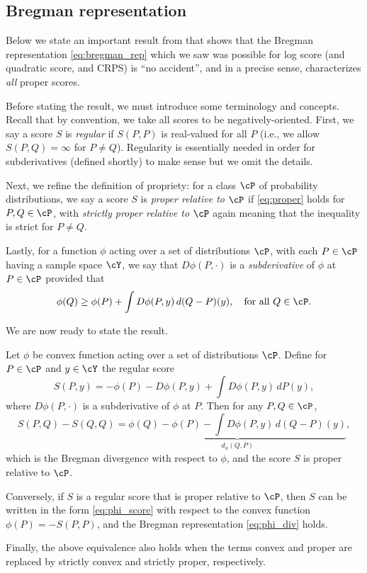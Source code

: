 \documentclass{article}
\begin{document}
\subsection{Bregman representation}
\label{sec:bregman_rep}

Below we state an important result from \citet{gneiting2007strictly} that shows
that the Bregman representation \eqref{eq:bregman_rep} which we saw was possible 
for log score (and quadratic score, and CRPS) is ``no accident'', and in a
precise sense, characterizes \emph{all} proper scores.    

Before stating the result, we must introduce some terminology and
concepts. Recall that by convention, we take all scores to be
negatively-oriented. First, we say a score $S$ is \emph{regular} if $S(P,P)$ is 
real-valued for all $P$ (i.e., we allow $S(P, Q) = \infty$ for $P \not=
Q$). Regularity is essentially needed in order for subderivatives (defined 
shortly) to make sense but we omit the details. 

Next, we refine the definition of propriety: for a class $\cP$ of probability
distributions, we say a score $S$ is \emph{proper relative to $\cP$} if
\eqref{eq:proper} holds for $P,Q \in \cP$, with \emph{strictly proper relative 
  to $\cP$} again meaning that the inequality is strict for $P \not= Q$.  

Lastly, for a function $\phi$ acting over a set of distributions $\cP$, with
each $P \in \cP$ having a sample space $\cY$, we say that $D\phi(P, \cdot)$ is a
\emph{subderivative} of $\phi$ at $P \in \cP$ provided that 
\begin{equation}
\label{eq:subderiv}
\phi(Q) \geq \phi(P) + \int D\phi(P, y) \, d(Q-P)(y), \quad \text{for all $Q \in
  \cP$}.  
\end{equation}

We are now ready to state the result. 

\begin{theorem}
Let $\phi$ be convex function acting over a set of distributions $\cP$. Define
for $P \in \cP$ and $y \in \cY$ the regular score  
\begin{equation}
\label{eq:phi_score}
S(P, y) = -\phi(P) - D\phi(P, y) + \int D\phi(P, y) \, dP(y),
\end{equation}
where $D\phi(P, \cdot)$ is a subderivative of $\phi$ at $P$. Then for any $P,Q
\in \cP$, 
\begin{equation}
\label{eq:phi_div}
S(P, Q) - S(Q, Q) = \underbrace{\phi(Q) - \phi(P) - \int D\phi(P, y) \,
  d(Q-P)(y)}_{d_\phi(Q,P)},
\end{equation}
which is the Bregman divergence with respect to $\phi$, and the score $S$ is
proper relative to $\cP$.  

Conversely, if $S$ is a regular score that is proper relative to $\cP$, then $S$
can be written in the form \eqref{eq:phi_score} with respect to the convex
function $\phi(P) = -S(P, P)$, and the Bregman representation \eqref{eq:phi_div}
holds.    

Finally, the above equivalence also holds when the terms convex and proper are
replaced by strictly convex and strictly proper, respectively.  
\end{theorem}
\end{document}
